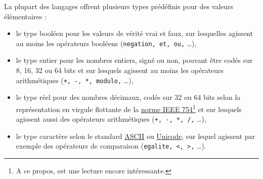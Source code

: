 \documentclass[a4paper,francais]{insalyon}
\begin{document}
La plupart des langages offrent plusieurs types prédéfinis pour des valeurs élémentaires :
\begin{itemize}
\item le type booléen pour les valeurs de vérité vrai et faux, sur lesquelles agissent au moins les opérateurs booléens (\verb!negation, et, ou,! \ldots),
\item le type entier pour les nombres entiers, signé ou non, pouvant être codés sur 8, 16, 32 ou 64 bits et sur lesquels agissent au moins les opérateurs arithmétiques (\verb!+, -, *, modulo,! \ldots), 
\item le type réel pour des nombres décimaux, codés sur 32 ou 64 bits selon la représentation en virgule flottante de la \href{https://fr.wikipedia.org/wiki/IEEE_754}{norme IEEE 754}\footnote{A ce propos, \cite{goldberg91} est une lecture encore intéressante.} et sur lesquels agissent aussi des opérateurs arithmétiques (\verb!+, -, *, /,! \ldots),
\item le type caractère selon le standard \href{https://fr.wikipedia.org/wiki/American_Standard_Code_for_Information_Interchange}{ASCII} ou \href{https://fr.wikipedia.org/wiki/Unicode}{Unicode}, sur lequel agissent par exemple des opérateurs de comparaison (\verb!egalite, <, >,! \ldots).
\end{itemize}
\end{document}
